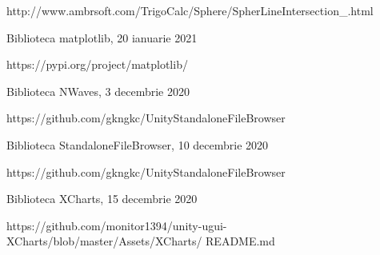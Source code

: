 \begin{thebibliography}{99.}
http://www.ambrsoft.com/TrigoCalc/Sphere/SpherLineIntersection\_.html

 Biblioteca matplotlib, 20 ianuarie 2021

https://pypi.org/project/matplotlib/

 Biblioteca NWaves, 3 decembrie 2020

https://github.com/gkngkc/UnityStandaloneFileBrowser

 Biblioteca StandaloneFileBrowser, 10 decembrie 2020

https://github.com/gkngkc/UnityStandaloneFileBrowser

 Biblioteca XCharts, 15 decembrie 2020

https://github.com/monitor1394/unity-ugui-XCharts/blob/master/Assets/XCharts/ README.md

\end{thebibliography}
